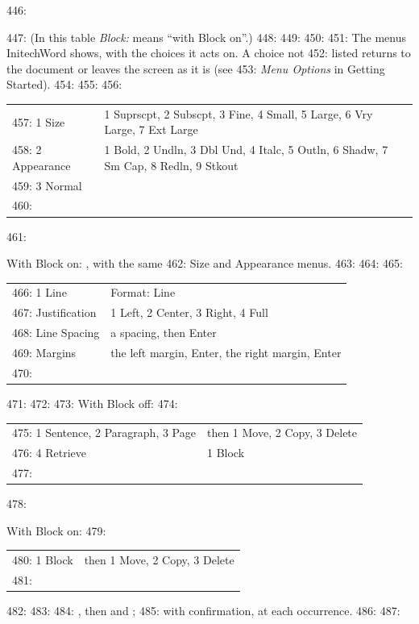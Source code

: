 446: \par\addvspace{4pt}
447: (In this table \textit{Block:} means ``with Block on''.)
448: 
449: %
450: 
451: The menus InitechWord shows, with the choices it acts on.  A choice not
452: listed returns to the document or leaves the screen as it is (see
453: \textit{Menu Options} in Getting Started).
454: 
455: 
456: \begin{tabular}{@{}lp{70mm}@{}}
457: 1 Size & 1 Suprscpt, 2 Subscpt, 3 Fine, 4 Small, 5 Large, 6 Vry Large, 7 Ext Large\\
458: 2 Appearance & 1 Bold, 2 Undln, 3 Dbl Und, 4 Italc, 5 Outln, 6 Shadw, 7 Sm Cap, 8 Redln, 9 Stkout\\
459: 3 Normal & \\
460: \end{tabular}
461: \par With Block on: , with the same
462: Size and Appearance menus.
463: 
464: 
465: \begin{tabular}{@{}ll@{}}
466: 1 Line & Format: Line\\
467: \quad 3 Justification & 1 Left, 2 Center, 3 Right, 4 Full\\
468: \quad 6 Line Spacing & a spacing, then Enter\\
469: \quad 7 Margins & the left margin, Enter, the right margin, Enter\\
470: \end{tabular}
471: 
472: 
473: With Block off:
474: \par\noindent\begin{tabular}{@{}ll@{}}
475: 1 Sentence, 2 Paragraph, 3 Page & then 1 Move, 2 Copy, 3 Delete\\
476: 4 Retrieve & 1 Block\\
477: \end{tabular}
478: \par With Block on:
479: \par\noindent\begin{tabular}{@{}ll@{}}
480: 1 Block & then 1 Move, 2 Copy, 3 Delete\\
481: \end{tabular}
482: 
483: 
484: , then  and ;
485: with confirmation,  at each occurrence.
486: 
487: 
